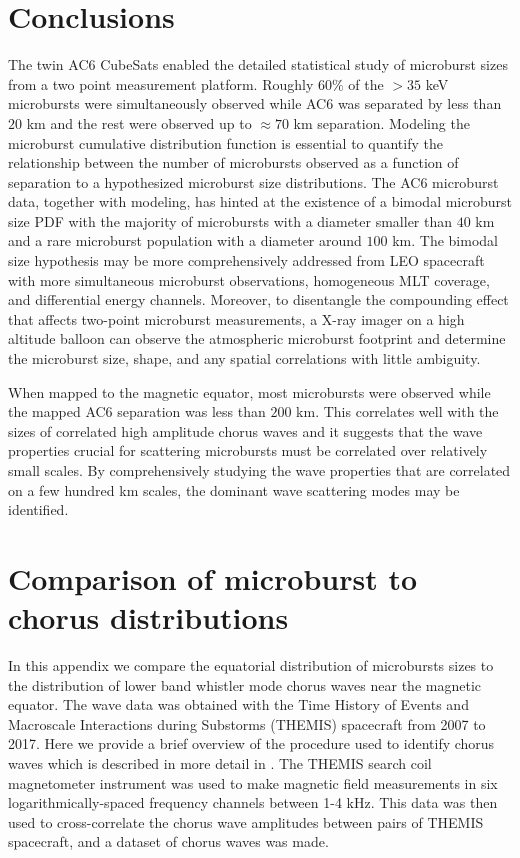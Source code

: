 \documentclass[draft]{agujournal2019}
\begin{document}
\section{Conclusions}
The twin AC6 CubeSats enabled the detailed statistical study of microburst sizes from a two point measurement platform. Roughly $60 \%$ of the $> 35$ keV microbursts were simultaneously observed while AC6 was separated by less than $20$ km and the rest were observed up to $\approx 70$ km separation. Modeling the microburst cumulative distribution function is essential to quantify the relationship between the number of microbursts observed as a function of separation to a hypothesized microburst size distributions. The AC6 microburst data, together with modeling, has hinted at the existence of a bimodal microburst size PDF with the majority of microbursts with a diameter smaller than $40$ km and a rare microburst population with a diameter around $100$ km. The bimodal size hypothesis may be more comprehensively addressed from LEO spacecraft with more simultaneous microburst observations, homogeneous MLT coverage, and differential energy channels. Moreover, to disentangle the compounding effect that affects two-point microburst measurements, a X-ray imager on a high altitude balloon can observe the atmospheric microburst footprint and determine the microburst size, shape, and any spatial correlations with little ambiguity. 

When mapped to the magnetic equator, most microbursts were observed while the mapped AC6 separation was less than $200$ km. This correlates well with the sizes of correlated high amplitude chorus waves and it suggests that the wave properties crucial for scattering microbursts must be correlated over relatively small scales. By comprehensively studying the wave properties that are correlated on a few hundred km scales, the dominant wave scattering modes may be identified.

\appendix

\section{Comparison of microburst to chorus distributions} \label{appendixa}
In this appendix we compare the equatorial distribution of microbursts sizes to the distribution of lower band whistler mode chorus waves near the magnetic equator. The wave data was obtained with the Time History of Events and Macroscale Interactions during Substorms (THEMIS) spacecraft from 2007 to 2017. Here we provide a brief overview of the procedure used to identify chorus waves which is described in more detail in . The THEMIS search coil magnetometer instrument was used to make magnetic field measurements in six logarithmically-spaced frequency channels between 1-4 kHz. This data was then used to cross-correlate the chorus wave amplitudes between pairs of THEMIS spacecraft, and a dataset of chorus waves was made.
\end{document}
